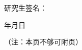 \par\vspace{0.1cm}
\noindent\begin{minipage}{\linewidth}
\noindent\hfill 研究生签名：\makebox[3.2cm][l]{}\par
\vspace{0.05cm}
\noindent\hfill 年\hspace{1.0cm}月\hspace{1.0cm}日\hspace{0.8cm}\par
\vspace{0.05cm}
\noindent（注：本页不够可附页）
\end{minipage}\par
